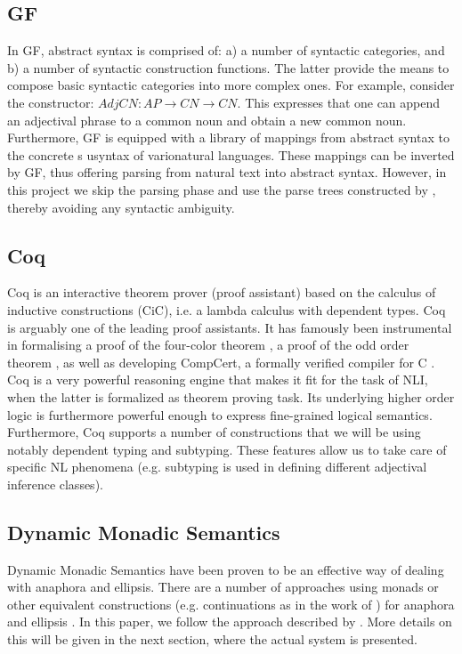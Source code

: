\documentclass[11pt]{article}
\begin{document}
\subsection{GF}
In GF, abstract syntax is comprised of: a) a number of syntactic
categories, and b) a number of syntactic construction functions. The latter
provide the means to compose basic syntactic categories into more complex
ones.  For example, consider the constructor: $AdjCN : AP → CN → CN$. This  expresses
that one can append an adjectival phrase to a common noun and obtain
a new common noun. Furthermore,  GF is equipped  with a library of mappings from abstract
syntax to the concrete s usyntax of varionatural languages. These mappings can be inverted by GF, thus offering
parsing from natural text into abstract syntax. However, in this project we skip the
parsing phase and use the parse trees constructed by \citet{Ljunglof:2012},
thereby avoiding any syntactic ambiguity. 

\subsection{Coq}
Coq is an interactive theorem prover (proof assistant) based on the
calculus of inductive constructions (CiC), i.e.  a lambda calculus
with dependent types. Coq is arguably one of the leading proof
assistants. It has famously been instrumental in formalising a proof
of the four-color theorem \citep{Gonthier:2008}, a proof of the odd
order theorem \citep{Gonthier:2013}, as well as developing CompCert, a
formally verified compiler for C \citep{Leroy}. Coq is a very powerful
reasoning engine that makes it fit for the task of NLI, when the
latter is formalized as theorem proving task. Its underlying higher
order logic is furthermore powerful enough to express fine-grained
logical semantics. Furthermore, Coq supports a number of constructions
that we will be using notably dependent typing and subtyping. These
features allow us to take care of specific NL phenomena
(e.g. subtyping is used in defining different adjectival inference
classes).

\subsection{Dynamic Monadic Semantics}
Dynamic Monadic Semantics have been proven to be an effective way of
dealing with anaphora and ellipsis. There are a number of approaches
using monads or other equivalent constructions (e.g. continuations as in the work of
\citet{de2006}) for anaphora and ellipsis
\citet{Shan:2002,unger:2011,Barker:04,de2016,charlow:2017}. In this
paper, we follow the approach described by
\citet{bernardy_jolli}. More details on this will be given in the next
section, where the actual system is presented.
\end{document}
